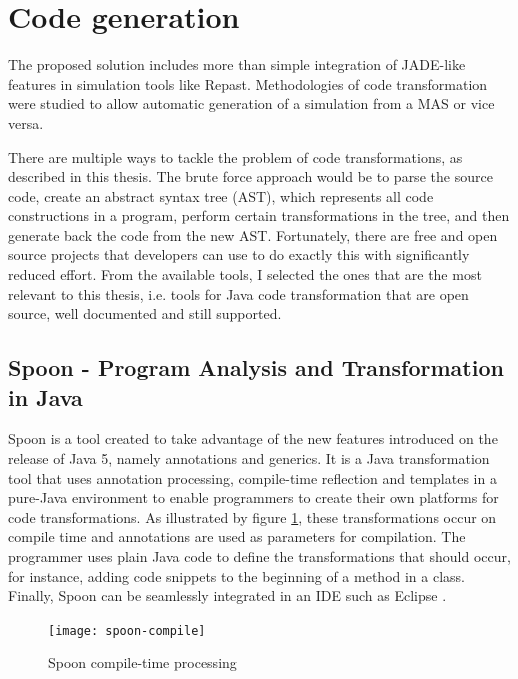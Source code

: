 \section{Code generation}

The proposed solution includes more than simple integration of JADE-like features in simulation tools like Repast. Methodologies of code transformation were studied to allow automatic generation of a simulation from a MAS or vice versa.

There are multiple ways to tackle the problem of code transformations, as described in this thesis. The brute force approach would be to parse the source code, create an abstract syntax tree (AST), which represents all code constructions in a program, perform certain transformations in the tree, and then generate back the code from the new AST. Fortunately, there are free and open source projects that developers can use to do exactly this with significantly reduced effort. From the available tools, I selected the ones that are the most relevant to this thesis, i.e. tools for Java code transformation that are open source, well documented and still supported.


\subsection{Spoon - Program Analysis and Transformation in Java}
	Spoon is a tool created to take advantage of the new features introduced on the release of Java 5, namely annotations and generics. It is a Java transformation tool that uses annotation processing, compile-time reflection and templates in a pure-Java environment to enable programmers to create their own platforms for code transformations. As illustrated by figure \ref{fig:spoon-compile}, these transformations occur on compile time and annotations are used as parameters for compilation. The programmer uses plain Java code to define the transformations that should occur, for instance, adding code snippets to the beginning of a method in a class. Finally, Spoon can be seamlessly integrated in an IDE such as Eclipse \cite{spoon,pawlak2006spoon}.

	\begin{figure}[h]
	  \begin{center}
	    \leavevmode
	    \texttt{[image: spoon-compile]}
	    \caption{Spoon compile-time processing \cite{pawlak2006spoon}}
	    \label{fig:spoon-compile}
	  \end{center}
	\end{figure}

